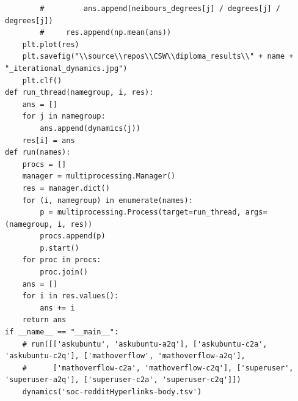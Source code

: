 \documentclass[bachelor, och, diploma]{SCWorks}
\begin{document}
\begin{verbatim}
        #         ans.append(neibours_degrees[j] / degrees[j] / degrees[j])
        #     res.append(np.mean(ans))
    plt.plot(res)
    plt.savefig("\\source\\repos\\CSW\\diploma_results\\" + name + "_iterational_dynamics.jpg")
    plt.clf()  
def run_thread(namegroup, i, res):
    ans = []
    for j in namegroup:
        ans.append(dynamics(j))
    res[i] = ans
def run(names):
    procs = []
    manager = multiprocessing.Manager()
    res = manager.dict()
    for (i, namegroup) in enumerate(names):
        p = multiprocessing.Process(target=run_thread, args=(namegroup, i, res))
        procs.append(p)
        p.start()
    for proc in procs:
        proc.join()
    ans = []
    for i in res.values():
        ans += i
    return ans
if __name__ == "__main__":
    # run([['askubuntu', 'askubuntu-a2q'], ['askubuntu-c2a', 'askubuntu-c2q'], ['mathoverflow', 'mathoverflow-a2q'], 
    #      ['mathoverflow-c2a', 'mathoverflow-c2q'], ['superuser', 'superuser-a2q'], ['superuser-c2a', 'superuser-c2q']])
    dynamics('soc-redditHyperlinks-body.tsv')
\end{verbatim}
\end{document}
